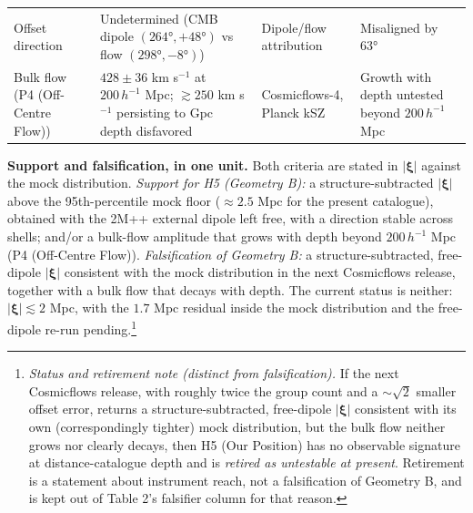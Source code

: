 \documentclass[
]{article}
\begin{document}
\begin{longtable}[]{@{}llll@{}}
\begin{minipage}[t]{0.22\columnwidth}
Offset direction\strut
\end{minipage} & \begin{minipage}[t]{0.22\columnwidth}\raggedright
Undetermined (CMB dipole \((264°,+48°)\) vs flow \((298°,-8°)\))\strut
\end{minipage} & \begin{minipage}[t]{0.22\columnwidth}\raggedright
Dipole/flow attribution\strut
\end{minipage} & \begin{minipage}[t]{0.22\columnwidth}\raggedright
Misaligned by \(63°\)\strut
\end{minipage}\tabularnewline
\begin{minipage}[t]{0.22\columnwidth}\raggedright
Bulk flow (P4 (Off-Centre Flow))\strut
\end{minipage} & \begin{minipage}[t]{0.22\columnwidth}\raggedright
\(428 \pm 36\) km s\(^{-1}\) at \(200\,h^{-1}\) Mpc; \(\gtrsim 250\) km
s\(^{-1}\) persisting to Gpc depth disfavored\strut
\end{minipage} & \begin{minipage}[t]{0.22\columnwidth}\raggedright
Cosmicflows-4, Planck kSZ\strut
\end{minipage} & \begin{minipage}[t]{0.22\columnwidth}\raggedright
Growth with depth untested beyond \(200\,h^{-1}\) Mpc\strut
\end{minipage}\tabularnewline
\bottomrule
\end{longtable}

\textbf{Support and falsification, in one unit.} Both criteria are
stated in \(|\boldsymbol{\xi}|\) against the mock distribution.
\emph{Support for H5 (Geometry B):} a structure-subtracted
\(|\boldsymbol{\xi}|\) above the 95th-percentile mock floor
(\(\approx 2.5\) Mpc for the present catalogue), obtained with the 2M++
external dipole left free, with a direction stable across shells; and/or
a bulk-flow amplitude that grows with depth beyond \(200\,h^{-1}\) Mpc
(P4 (Off-Centre Flow)). \emph{Falsification of Geometry B:} a
structure-subtracted, free-dipole \(|\boldsymbol{\xi}|\) consistent with
the mock distribution in the next Cosmicflows release, together with a
bulk flow that decays with depth. The current status is neither:
\(|\boldsymbol{\xi}| \lesssim 2\) Mpc, with the \(1.7\) Mpc residual
inside the mock distribution and the free-dipole re-run
pending.\footnote{\emph{Status and retirement note (distinct from
  falsification).} If the next Cosmicflows release, with roughly twice
  the group count and a \(\sim\!\sqrt{2}\) smaller offset error, returns
  a structure-subtracted, free-dipole \(|\boldsymbol{\xi}|\) consistent
  with its own (correspondingly tighter) mock distribution, but the bulk
  flow neither grows nor clearly decays, then H5 (Our Position) has no
  observable signature at distance-catalogue depth and is \emph{retired
  as untestable at present}. Retirement is a statement about instrument
  reach, not a falsification of Geometry B, and is kept out of Table 2's
  falsifier column for that reason.}
\end{document}
